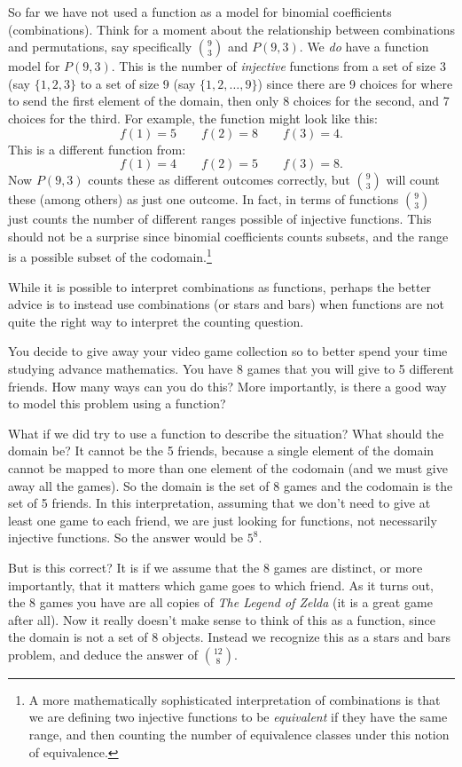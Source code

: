 \documentclass[12pt]{article}
\begin{document}
So far we have not used a function as a model for binomial coefficients (combinations).  Think for a moment about the relationship between combinations and permutations, say specifically ${9 \choose 3}$ and $P(9,3)$.  We \emph{do} have a function model for $P(9,3)$.  This is the number of \emph{injective} functions from a set of size 3 (say $\{1,2,3\}$ to a set of size 9 (say $\{1,2,\ldots, 9\}$) since there are 9 choices for where to send the first element of the domain, then only 8 choices for the second, and 7 choices for the third.  For example, the function might look like this:
\[f(1) = 5 \qquad f(2) = 8 \qquad f(3) = 4.\]
This is a different function from: 
\[f(1) = 4 \qquad f(2) = 5 \qquad f(3) = 8.\]
Now $P(9,3)$ counts these as different outcomes correctly, but ${9\choose 3}$ will count these (among others) as just one outcome.  In fact, in terms of functions ${9 \choose 3}$ just counts the number of different ranges possible of injective functions.  This should not be a surprise since binomial coefficients counts subsets, and the range is a possible subset of the codomain.\footnote{A more mathematically sophisticated interpretation of combinations is that we are defining two injective functions to be \emph{equivalent} if they have the same range, and then counting the number of equivalence classes under this notion of equivalence.}

While it is possible to interpret combinations as functions, perhaps the better advice is to instead use combinations (or stars and bars) when functions are not quite the right way to interpret the counting question. 

\begin{example}
You decide to give away your video game collection so to better spend your time studying advance mathematics.  You have 8 games that you will give to 5 different friends.  How many ways can you do this?  More importantly, is there a good way to model this problem using a function?

\begin{solution}
What if we did try to use a function to describe the situation?  What should the domain be?  It cannot be the 5 friends, because a single element of the domain cannot be mapped to more than one element of the codomain (and we must give away all the games).  So the domain is the set of 8 games and the codomain is the set of 5 friends.  In this interpretation, assuming that we don't need to give at least one game to each friend, we are just looking for functions, not necessarily injective functions.  So the answer would be $5^8$.

But is this correct?  It is if we assume that the 8 games are distinct, or more importantly, that it matters which game goes to which friend.  As it turns out, the 8 games you have are all copies of \emph{The Legend of Zelda} (it is a great game after all).  Now it really doesn't make sense to think of this as a function, since the domain is not a set of 8 objects.  Instead we recognize this as a stars and bars problem, and deduce the answer of ${12 \choose 8}$.

\end{solution}

\end{example}
\end{document}
